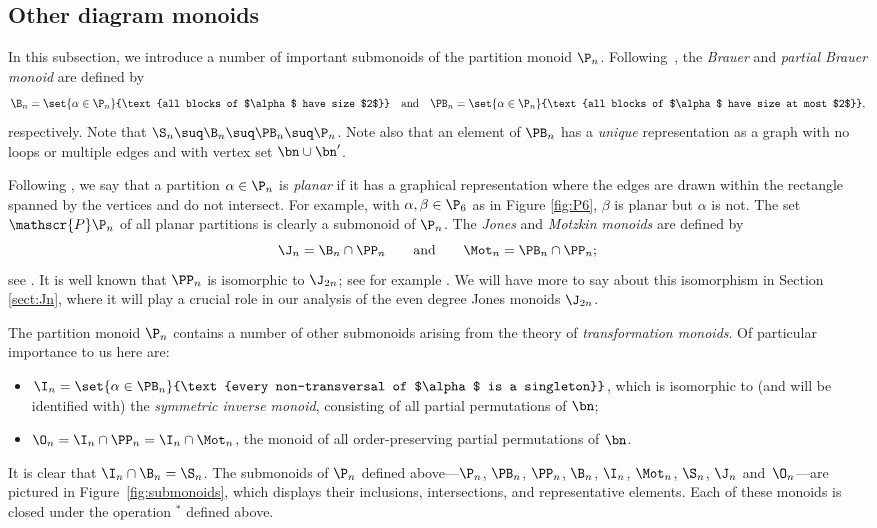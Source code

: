 \subsection{Other diagram monoids}\label{sec:prelim_other}


In this subsection, we introduce a number of important submonoids of the partition monoid $\P_n$.
Following~\cite{Maz1998},
the \emph{Brauer} and \emph{partial Brauer monoid} are defined by
\[
\B_n = \set{\alpha\in\P_n}{\text{all blocks of $\alpha$ have size $2$}} \quad\text{and}\quad
\PB_n = \set{\alpha\in\P_n}{\text{all blocks of $\alpha$ have size at most $2$}},
\]
respectively.  Note that $\S_n\suq\B_n\suq\PB_n\suq\P_n$.  Note also that an
element of $\PB_n$ has a \emph{unique} representation as a
graph with no loops or multiple edges and with vertex set $\bn\cup\bn'$.

Following \cite{Jones1994_2}, we say that a partition $\alpha\in\P_n$ is
\emph{planar} if it has a graphical representation where
the edges are drawn within the rectangle spanned by the vertices and do not intersect.
For example, with $\alpha,\beta\in\P_6$ as in
Figure \ref{fig:P6}, $\beta$ is planar but $\alpha$ is not.  The set
$\mathscr{P}\P_n$ of all planar partitions is clearly a submonoid of $\P_n$.
The \emph{Jones} and \emph{Motzkin monoids} are defined by
\[
\J_n = \B_n \cap \PP_n \qquad\text{and}\qquad \Mot_n=\PB_n\cap\PP_n;
\]
see \cite{HLP2013,LF2006}.  It is well known \cite{HR2005,Jones1994_2} that $\PP_n$ is isomorphic to $\J_{2n}$; see for example \cite[p873]{HR2005}.  We will have more to say about this isomorphism in Section \ref{sect:Jn}, where it will play a crucial role in our analysis of the even degree Jones monoids $\J_{2n}$.

The partition monoid $\P_n$ contains a number of other submonoids arising from the theory of \emph{transformation monoids}.
Of particular importance to us here are:
\begin{itemize}
\item
$\I_n = \set{\alpha\in\PB_n}{\text{every non-transversal of $\alpha$ is a singleton}}$,
which is isomorphic to (and will be identified with) the \emph{symmetric inverse monoid},
consisting of all partial permutations of $\bn$;
\item
$\O_n=\I_n\cap\PP_n=\I_n\cap\Mot_n$, the monoid of all order-preserving partial permutations of $\bn$.
\end{itemize}
It is clear that $\I_n\cap\B_n=\S_n$.
%
The submonoids of $\P_n$ defined above---$\P_n$, $\PB_n$, $\PP_n$, $\B_n$,
$\I_n$, $\Mot_n$, $\S_n$, $\J_n$ and~$\O_n$---are pictured in
Figure~\ref{fig:submonoids}, which displays their inclusions, intersections,
and representative elements.  Each of these monoids is closed under the
operation ${}^*$ defined above.

